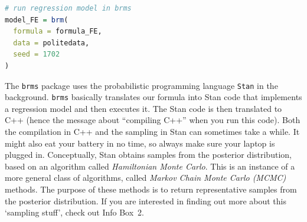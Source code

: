 \documentclass[nobib]{tufte-handout}
\begin{document}
\bigskip

\begin{minipage}[]{\textwidth}
\begin{lstlisting}[language=R]
# run regression model in brms
model_FE = brm(
  formula = formula_FE, 
  data = politedata, 
  seed = 1702 
)
\end{lstlisting}
\end{minipage}

\noindent The \texttt{brms} package uses the probabilistic programming language \texttt{Stan}
in the background. \texttt{brms} basically translates our formula into Stan code that
implements a regression model and then executes it. The Stan code is then translated to C++
(hence the message about ``compiling C++'' when you run this code). Both the compilation in C++
and the sampling in Stan can sometimes take a while. It might also eat your battery in no time,
so always make sure your laptop is plugged in. Conceptually, Stan obtains samples from the
posterior distribution, based on an algorithm called \emph{Hamiltonian Monte Carlo}. This is an
instance of a more general class of algorithms, called \emph{Markov Chain Monte Carlo (MCMC)}
methods. The purpose of these methods is to return representative samples from the posterior
distribution. If you are interested in finding out more about this `sampling stuff', check out
Info Box~2.
\end{document}
